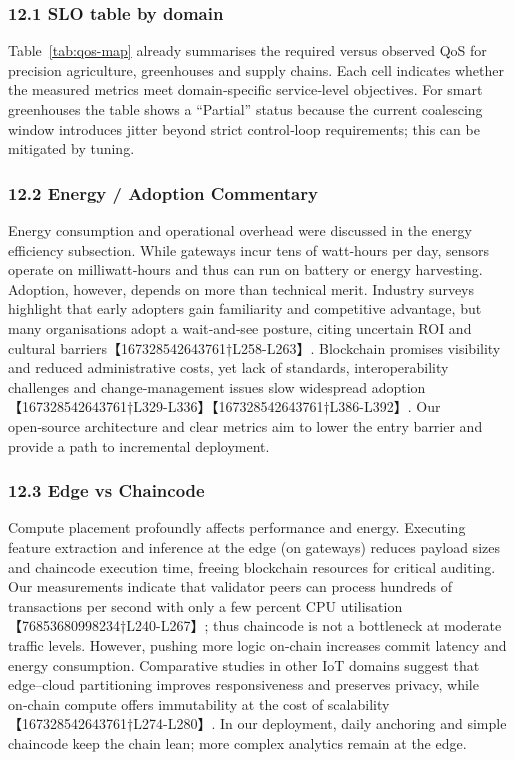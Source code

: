 \documentclass[12pt,onecolumn]{IEEEtran} %
\begin{document}
\subsubsection*{12.1 SLO table by domain}
Table~\ref{tab:qos-map} already summarises the required versus observed QoS for precision agriculture, greenhouses and supply chains.  Each cell indicates whether the measured metrics meet domain‑specific service‑level objectives.  For smart greenhouses the table shows a ``Partial'' status because the current coalescing window introduces jitter beyond strict control‑loop requirements; this can be mitigated by tuning.

\subsubsection*{12.2 Energy / Adoption Commentary}
Energy consumption and operational overhead were discussed in the energy efficiency subsection.  While gateways incur tens of watt‑hours per day, sensors operate on milliwatt‑hours and thus can run on battery or energy harvesting.  Adoption, however, depends on more than technical merit.  Industry surveys highlight that early adopters gain familiarity and competitive advantage, but many organisations adopt a wait‑and‑see posture, citing uncertain ROI and cultural barriers【167328542643761†L258-L263】.  Blockchain promises visibility and reduced administrative costs, yet lack of standards, interoperability challenges and change‑management issues slow widespread adoption【167328542643761†L329-L336】【167328542643761†L386-L392】.  Our open‑source architecture and clear metrics aim to lower the entry barrier and provide a path to incremental deployment.

\subsubsection*{12.3 Edge vs Chaincode}
Compute placement profoundly affects performance and energy.  Executing feature extraction and inference at the edge (on gateways) reduces payload sizes and chaincode execution time, freeing blockchain resources for critical auditing.  Our measurements indicate that validator peers can process hundreds of transactions per second with only a few percent CPU utilisation【76853680998234†L240-L267】; thus chaincode is not a bottleneck at moderate traffic levels.  However, pushing more logic on‑chain increases commit latency and energy consumption.  Comparative studies in other IoT domains suggest that edge–cloud partitioning improves responsiveness and preserves privacy, while on‑chain compute offers immutability at the cost of scalability【167328542643761†L274-L280】.  In our deployment, daily anchoring and simple chaincode keep the chain lean; more complex analytics remain at the edge.
\end{document}
